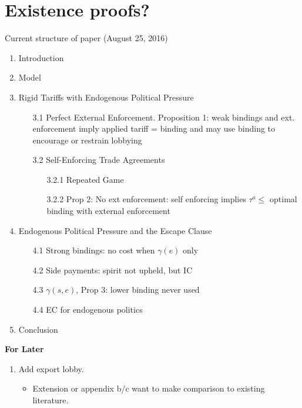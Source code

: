 \documentclass[12pt]{article}
\newcommand{\ga}{\gamma}
\begin{document}
\section{Existence proofs?}

\newpage
Current structure of paper (August 25, 2016)
\begin{enumerate}
	\item Introduction
	\item Model
	\item Rigid Tariffs with Endogenous Political Pressure
		\begin{itemize}
			\item[3.1] Perfect External Enforcement. Proposition 1: weak bindings and ext. enforcement imply applied tariff = binding and may use binding to encourage or restrain lobbying
			\item[3.2] Self-Enforcing Trade Agreements
				\begin{itemize}
					\item[3.2.1] Repeated Game
					\item[3.2.2] Prop 2: No ext enforcement: self enforcing implies $\tau^a \leq$ optimal binding with external enforcement
				\end{itemize}
		\end{itemize}
	\item Endogenous Political Pressure and the Escape Clause
		\begin{itemize}
			\item[4.1] Strong bindings: no cost when $\ga(e)$ only
			\item[4.2] Side payments: spirit not upheld, but IC
			\item[4.3] $\ga(s,e)$, Prop 3: lower binding never used
			\item[4.4] EC for endogenous politics
		\end{itemize}
	\item Conclusion
\end{enumerate}


\newpage
\begin{center}
\textbf{\large{For Later}}
\end{center}
\begin{enumerate}
	\item Add export lobby. 
		\begin{itemize}
			\item Extension or appendix b/c want to make comparison to existing literature.
		\end{itemize}
\end{enumerate}
\end{document}
